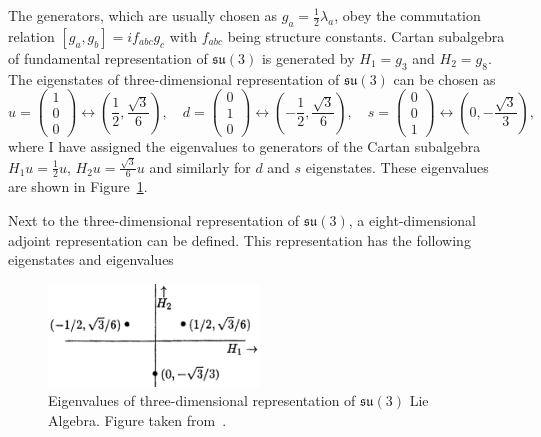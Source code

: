The generators, which are usually chosen as $g_a = \frac{1}{2} \lambda_a$, obey the
commutation relation $[g_a,g_b]=if_{abc}g_c$ with $f_{abc}$ being structure
constants. Cartan subalgebra of fundamental representation of $\mathfrak{su}(3)$
is generated by $H_1=g_3$ and $H_2=g_8$. The eigenstates of three-dimensional
representation of $\mathfrak{su}(3)$ can be chosen as
\small
\begin{equation}
  u = \begin{pmatrix} 1 \\ 0 \\ 0 \end{pmatrix} \leftrightarrow \left(
    \frac{1}{2}, \frac{\sqrt{3}}{6} \right), \quad
  d = \begin{pmatrix} 0 \\ 1 \\ 0 \end{pmatrix} \leftrightarrow \left(
    - \frac{1}{2}, \frac{\sqrt{3}}{6} \right), \quad
  s = \begin{pmatrix} 0 \\ 0 \\ 1 \end{pmatrix} \leftrightarrow \left(
    0, - \frac{\sqrt{3}}{3} \right), \quad
  \label{eq:RepresentLie3}
\end{equation}
\normalsize
where I have assigned the eigenvalues to generators of the Cartan subalgebra 
$H_1 u = \frac{1}{2} u$, $H_2 u = \frac{\sqrt{3}}{6} u$ and similarly
for $d$ and $s$ eigenstates. 
These eigenvalues are shown in Figure~\ref{fig:QuarkTriplet}. 

Next to the three-dimensional representation of $\mathfrak{su}(3)$, a
eight-dimensional adjoint representation can be defined.
This representation has the following eigenstates and eigenvalues

\begin{figure}[t]
  \centering
  \includegraphics[width=0.5\textwidth]{Chapter1/Quark-triplet.png} 
  \caption[Eigenvalues of three-dimensional representation of $\mathfrak{su}(3)$
          Lie Algebra.]
          {Eigenvalues of three-dimensional representation of $\mathfrak{su}(3)$ Lie
          Algebra. Figure taken from~\cite{LieAlgebrasForParticlePhysicists}.}
  \label{fig:QuarkTriplet}
\end{figure}

